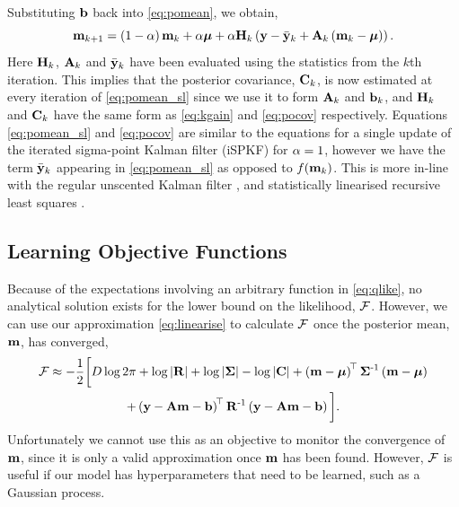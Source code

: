 \documentclass{article} %
\begin{document}
Substituting $\mathbf{b}$ back into \eqref{eq:pomean}, we obtain, 
\begin{equation}
    \mathbf{m}_{k+1} = \left({1-\alpha}\right)\mathbf{m}_k + \alpha\boldsymbol{\mu} 
        + \alpha\mathbf{H}_k\left({\mathbf{y} - \bar{\mathbf{y}}_k 
        + \mathbf{A}_k\left({\mathbf{m}_k - \boldsymbol{\mu}}\right)}\right).
    \label{eq:pomean_sl}
\end{equation}
Here $\mathbf{H}_k$, $\mathbf{A}_k$ and $\bar{\mathbf{y}}_k$ have been evaluated using the
statistics from the $k$th iteration. This implies that the posterior
covariance, $\mathbf{C}_k$, is now estimated at every iteration of
\eqref{eq:pomean_sl} since we use it to form $\mathbf{A}_k$ and $\mathbf{b}_k$, and 
$\mathbf{H}_k$ and $\mathbf{C}_k$ have the same form as \eqref{eq:kgain} and
\eqref{eq:pocov} respectively. Equations \eqref{eq:pomean_sl} and
\eqref{eq:pocov} are similar to the equations for a single update of the
iterated sigma-point Kalman filter (iSPKF) \cite{Sibley2006} for $\alpha = 1$,
however we have the term $\bar{\mathbf{y}}_k$ appearing in \eqref{eq:pomean_sl} as
opposed to $f\!\left({{\mathbf{m}_k}}\right)$. This is more in-line with the regular
unscented Kalman filter \cite{Julier2004}, and statistically linearised
recursive least squares \cite{Geist2010}.


\subsection{Learning Objective Functions}

Because of the expectations involving an arbitrary function in
\eqref{eq:qlike}, no analytical solution exists for the lower bound on the
likelihood, $\mathcal{F}$. However, we can use our approximation
\eqref{eq:linearise} to calculate $\mathcal{F}$ once the posterior
mean, $\mathbf{m}$, has converged,
\begin{multline}
    \mathcal{F} \approx - \frac{1}{2} \bigg[
        D\log{2\pi} + \log\left|{\mathbf{R}}\right| + \log\left|{\boldsymbol{\Sigma}}\right| 
        - \log\left|{\mathbf{C}}\right|
    + \left({\mathbf{m} - \boldsymbol{\mu}}\right)^{\!\top}\boldsymbol{\Sigma}^{\text{-}1}
        \left({\mathbf{m} - \boldsymbol{\mu}}\right) \\
    + \left({\mathbf{y} - \mathbf{A}\mathbf{m} - \mathbf{b}}\right)^{\!\top}\mathbf{R}^{\text{-}1}
        \left({\mathbf{y} - \mathbf{A}\mathbf{m} - \mathbf{b}}\right)
        \bigg].
    \label{eq:approxfengy}
\end{multline}
Unfortunately we cannot use this as an objective to monitor the convergence of
$\mathbf{m}$, since it is only a valid approximation once $\mathbf{m}$ has been
found. However, $\mathcal{F}$ is useful if our model has hyperparameters that need
to be learned, such as a Gaussian process. 
\end{document}
